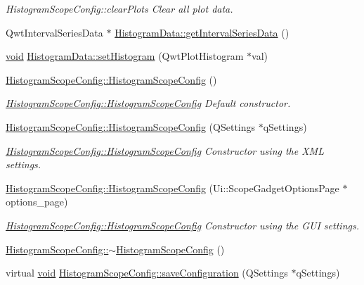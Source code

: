 \begin{DoxyCompactItemize}
\begin{DoxyCompactList}\small\item\em \-Histogram\-Scope\-Config\-::clear\-Plots \-Clear all plot data. \end{DoxyCompactList}\item 
\-Qwt\-Interval\-Series\-Data $\ast$ \hyperlink{group___scope_plugin_ga025ada984f64906121e98805e9ab43b4}{\-Histogram\-Data\-::get\-Interval\-Series\-Data} ()
\item 
\hyperlink{group___u_a_v_objects_plugin_ga444cf2ff3f0ecbe028adce838d373f5c}{void} \hyperlink{group___scope_plugin_ga2f4dbd730d5616dbd15922f23f775d02}{\-Histogram\-Data\-::set\-Histogram} (\-Qwt\-Plot\-Histogram $\ast$val)
\item 
\hyperlink{group___scope_plugin_ga3770fc706fe9b5fdd16bad59dfc23fa1}{\-Histogram\-Scope\-Config\-::\-Histogram\-Scope\-Config} ()
\begin{DoxyCompactList}\small\item\em \hyperlink{group___scope_plugin_ga3770fc706fe9b5fdd16bad59dfc23fa1}{\-Histogram\-Scope\-Config\-::\-Histogram\-Scope\-Config} \-Default constructor. \end{DoxyCompactList}\item 
\hyperlink{group___scope_plugin_ga0a412b8c840e9f5bc746d492cafed2a5}{\-Histogram\-Scope\-Config\-::\-Histogram\-Scope\-Config} (\-Q\-Settings $\ast$q\-Settings)
\begin{DoxyCompactList}\small\item\em \hyperlink{group___scope_plugin_ga3770fc706fe9b5fdd16bad59dfc23fa1}{\-Histogram\-Scope\-Config\-::\-Histogram\-Scope\-Config} \-Constructor using the \-X\-M\-L settings. \end{DoxyCompactList}\item 
\hyperlink{group___scope_plugin_gaa8c3ad4f914751d27033f2c70ea2fc2c}{\-Histogram\-Scope\-Config\-::\-Histogram\-Scope\-Config} (\-Ui\-::\-Scope\-Gadget\-Options\-Page $\ast$options\-\_\-page)
\begin{DoxyCompactList}\small\item\em \hyperlink{group___scope_plugin_ga3770fc706fe9b5fdd16bad59dfc23fa1}{\-Histogram\-Scope\-Config\-::\-Histogram\-Scope\-Config} \-Constructor using the \-G\-U\-I settings. \end{DoxyCompactList}\item 
\hyperlink{group___scope_plugin_gafbd12c48895f5b324a0048f956c2a773}{\-Histogram\-Scope\-Config\-::$\sim$\-Histogram\-Scope\-Config} ()
\item 
virtual \hyperlink{group___u_a_v_objects_plugin_ga444cf2ff3f0ecbe028adce838d373f5c}{void} \hyperlink{group___scope_plugin_ga08dd5f7ac27b067ed6eddc9e645bce45}{\-Histogram\-Scope\-Config\-::save\-Configuration} (\-Q\-Settings $\ast$q\-Settings)

\end{DoxyCompactItemize}
